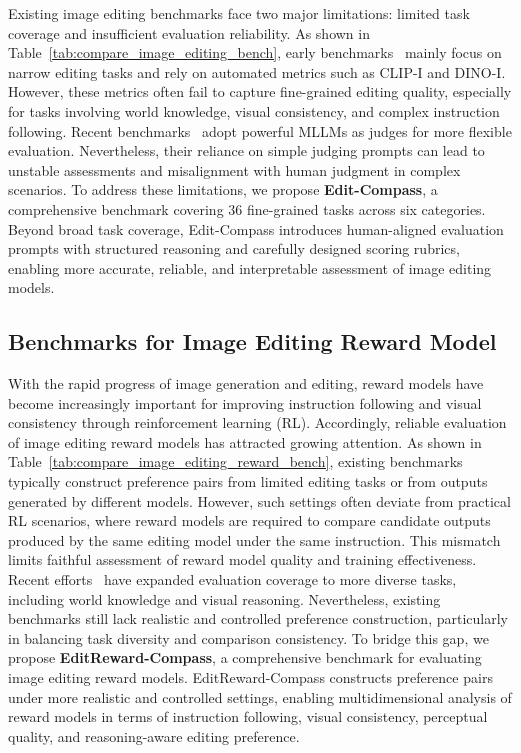 \documentclass{llmxive}
\providecommand{\bench}{Edit-Compass}
\providecommand{\rmbench}{EditReward-Compass}
\begin{document}
Existing image editing benchmarks face two major limitations: limited task coverage and insufficient evaluation reliability. As shown in Table~\ref{tab:compare_image_editing_bench}, early benchmarks~\cite{zhang2023magicbrush,sheynin2024emu,yu2025anyedit,pan2025ice} mainly focus on narrow editing tasks and rely on automated metrics such as CLIP-I and DINO-I. However, these metrics often fail to capture fine-grained editing quality, especially for tasks involving world knowledge, visual consistency, and complex instruction following.
Recent benchmarks~\cite{ye2025imgedit,liu2025step1x,zhao2025envisioning,zhang2026well} adopt powerful MLLMs as judges for more flexible evaluation. Nevertheless, their reliance on simple judging prompts can lead to unstable assessments and misalignment with human judgment in complex scenarios.
To address these limitations, we propose \textbf{{\bench}}, a comprehensive benchmark covering $36$ fine-grained tasks across six categories. Beyond broad task coverage, {\bench} introduces human-aligned evaluation prompts with structured reasoning and carefully designed scoring rubrics, enabling more accurate, reliable, and interpretable assessment of image editing models.


\subsection{Benchmarks for Image Editing Reward Model}



With the rapid progress of image generation and editing, reward models have become increasingly important for improving instruction following and visual consistency through reinforcement learning (RL). Accordingly, reliable evaluation of image editing reward models has attracted growing attention.
As shown in Table~\ref{tab:compare_image_editing_reward_bench}, existing benchmarks~\cite{luo2025editscore,wu2025editreward,hu2025multimodal} typically construct preference pairs from limited editing tasks or from outputs generated by different models. However, such settings often deviate from practical RL scenarios, where reward models are required to compare candidate outputs produced by the same editing model under the same instruction. This mismatch limits faithful assessment of reward model quality and training effectiveness.
Recent efforts~\cite{zhao2025envisioning,deng2025emerging} have expanded evaluation coverage to more diverse tasks, including world knowledge and visual reasoning. Nevertheless, existing benchmarks still lack realistic and controlled preference construction, particularly in balancing task diversity and comparison consistency.
To bridge this gap, we propose \textbf{{\rmbench}}, a comprehensive benchmark for evaluating image editing reward models. {\rmbench} constructs preference pairs under more realistic and controlled settings, enabling multidimensional analysis of reward models in terms of instruction following, visual consistency, perceptual quality, and reasoning-aware editing preference.
\end{document}
